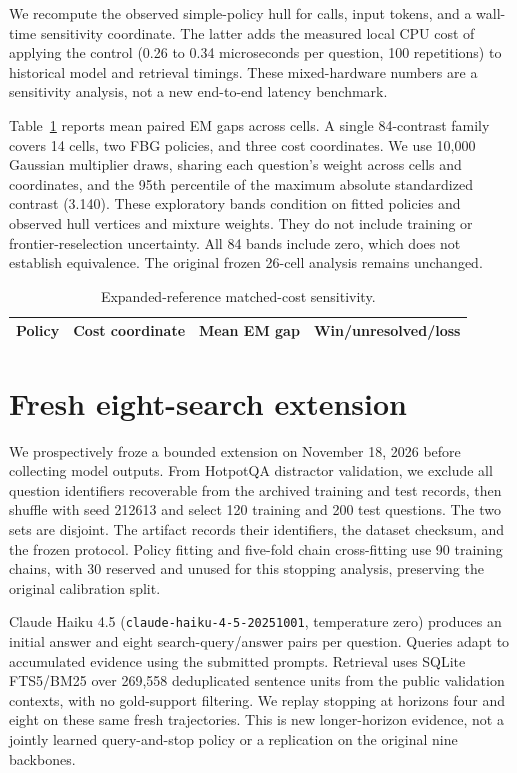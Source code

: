 \documentclass[manuscript,nonacm]{acmart}
\begin{document}
We recompute the observed simple-policy hull for calls, input tokens, and a
wall-time sensitivity coordinate. The latter adds the measured local CPU
cost of applying the control (0.26 to 0.34 microseconds per question, 100
repetitions) to historical model and retrieval timings. These mixed-hardware
numbers are a sensitivity analysis, not a new end-to-end latency benchmark.

Table~\ref{tab:deterministic-controls} reports mean paired EM gaps across
cells. A single 84-contrast family covers 14 cells, two FBG policies, and three
cost coordinates. We use 10,000 Gaussian multiplier draws, sharing each
question's weight across cells and coordinates, and the 95th percentile of
the maximum absolute standardized contrast (3.140). These exploratory bands
condition on fitted policies and observed hull vertices and mixture weights. They do not include training or frontier-reselection uncertainty. All 84
bands include zero, which does not establish equivalence. The original
frozen 26-cell analysis remains unchanged.

\begin{table}[htbp]
\centering\small
\caption{Expanded-reference matched-cost sensitivity.}
\label{tab:deterministic-controls}
\begin{tabular}{llrr}
\toprule
Policy & Cost coordinate & Mean EM gap & Win/unresolved/loss\\
\midrule

\bottomrule
\end{tabular}
\end{table}

\FloatBarrier
\section{Fresh eight-search extension}
\label{supp:long-horizon}
We prospectively froze a bounded extension on November 18, 2026 before
collecting model outputs. From HotpotQA distractor validation, we exclude
all question identifiers recoverable from the archived training and test
records, then shuffle with seed 212613 and select 120 training and 200 test
questions. The two sets are disjoint. The artifact records their identifiers,
the dataset checksum, and the frozen protocol. Policy fitting and five-fold
chain cross-fitting use 90 training chains, with 30 reserved and unused for
this stopping analysis, preserving the original calibration split.

Claude Haiku 4.5 (\texttt{claude-haiku-4-5-20251001}, temperature zero)
produces an initial answer and eight search-query/answer pairs per question.
Queries adapt to accumulated evidence using the submitted prompts. Retrieval
uses SQLite FTS5/BM25 over 269,558 deduplicated sentence units from the public
validation contexts, with no gold-support filtering. We replay stopping at
horizons four and eight on these same fresh trajectories. This is new
longer-horizon evidence, not a jointly learned query-and-stop policy or a
replication on the original nine backbones.
\end{document}
